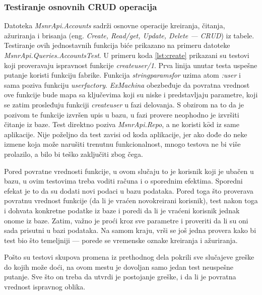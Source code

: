 \documentclass[12pt,oneside]{memoir}
\begin{document}
\subsubsection{Testiranje osnovnih CRUD operacija}

\par Datoteka \emph{MsnrApi.Accounts} sadrži osnovne operacije kreiranja, čitanja, ažuriranja i brisanja (eng. \emph{Create, Read/get, Update, Delete --- CRUD}) iz tabele. Testiranje ovih jednostavnih funkcija biće prikazano na primeru datoteke \emph{MsnrApi.Queries.AccountsTest}. U primeru koda \ref{lst:create} prikazani su testovi koji proveravaju ispravnost funkcije \emph{create{\textunderscore}user/1}. Prva linija unutar testa uspešne putanje koristi funkciju fabrike. Funkcija \emph{string{\textunderscore}params{\textunderscore}for} uzima atom \emph{:user} i sama poziva funkciju \emph{user{\textunderscore}factory}. \emph{ExMachina} obezbeđuje da povratna vrednost ove funkcije bude mapa sa ključevima koji su niske i predstavljaju parametre, koji se zatim prosleđuju funkciji \emph{create{\textunderscore}user} u fazi delovanja. S obzirom na to da je pozivom te funkcije izvršen upis u bazu, u fazi provere neophodno je izvršiti čitanje iz baze. Test direktno poziva \emph{MsnrApi.Repo}, a ne koristi k$\hat{o}$d iz same aplikacije. Nije poželjno da test zavisi od koda aplikacije, jer ako dođe do neke izmene koja može narušiti trenutnu funkcionalnost, mnogo testova ne bi više prolazilo, a bilo bi teško zaključiti zbog čega.  
\par Pored povratne vrednosti funkcije, u ovom slučaju to je korisnik koji je ubačen u bazu, u ovim testovima treba voditi računa i o sporednim efektima. Sporedni efekat je to da su dodati novi podaci u bazu podataka. Pored toga što proverava povratnu vrednost funkcije (da li je vraćen novokreirani korisnik), test nakon toga i dohvata konkretne podatke iz baze i poredi da li je vraćeni korisnik jednak onome iz baze. Zatim, važno je proći kroz sve parametre i proveriti da li su oni sada prisutni u bazi podataka. Na samom kraju, vrši se još jedna provera kako bi test bio što temeljniji --- porede se vremenske oznake kreiranja i ažuriranja.
\par Pošto su testovi skupova promena iz prethodnog dela pokrili sve slučajeve greške do kojih može doći, na ovom mestu je dovoljan samo jedan test neuspešne putanje. Sve što on treba da utvrdi je postojanje greške, i da li je povratna vrednost ispravnog oblika. 
\end{document}
